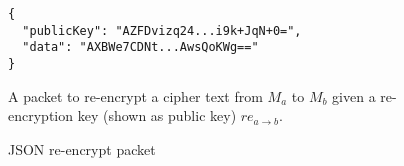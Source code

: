 \begin{figure}[H]
  \centering
  \begin{verbatim}
{
  "publicKey": "AZFDvizq24...i9k+JqN+0=",
  "data": "AXBWe7CDNt...AwsQoKWg=="
}
  \end{verbatim}
  \caption{
  	JSON re-encrypt packet
  }{
  	A packet to re-encrypt a cipher text from $M_a$ to $M_b$ given a re-encryption key (shown as public key) $re_{a \rightarrow b}$.
  }
  \label{code:reencrypt_data_json}
\end{figure}
